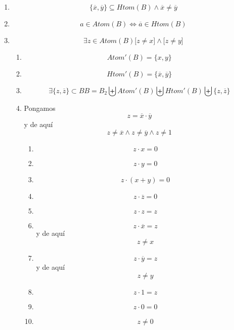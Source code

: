 \begin{enumerate}
\begin{enumerate}
\begin{enumerate}
\begin{enumerate}
\begin{enumerate}
\begin{enumerate}
\begin{enumerate}
              \begin{enumerate}
              \def\labelenumviii{\arabic{enumviii}.}
              \tightlist
              \item
                \[{{{({z \cdot a})} + \overline{a}} = {0 + \overline{a}}} = \overline{a}\]
              \item
                \[{z + \overline{a}} = \overline{a}\]
              \end{enumerate}
            \end{enumerate}
          \end{enumerate}
        \end{enumerate}
      \item
        \[{{\{{\overline{x},\overline{y}}\}} \subseteq \mathit{Htom}}{{{(B)} \land \overline{x}} \neq \overline{y}}\]
      \item
        \[{a \in \mathit{Atom}}{(B)}\Leftrightarrow{\overline{a} \in \mathit{Htom}}{(B)}\]
      \item
        \[\exists{z \in \mathit{Atom}}{(B)}{{\lbrack{z \neq x}\rbrack} \land {\lbrack{z \neq y}\rbrack}}\]

        \begin{enumerate}
        \def\labelenumv{\arabic{enumv}.}
        \item
          \[\mathit{Atom}'{{(B)} = {\{{x,y}\}}}\]
        \item
          \[\mathit{Htom}'{{(B)} = {\{{\overline{x},\overline{y}}\}}}\]
        \item
          \[\exists{{\{{z,\overline{z}}\}} \subset B}{B = B_{2}}\biguplus{\mathit{Atom}'{(B)}}\biguplus{\mathit{Htom}'{(B)}}\biguplus{\{{z,\overline{z}}\}}\]
        \item
          Pongamos \[z = {\overline{x} \cdot \overline{y}}\] y de
          aquí\[{{z \neq {\overline{x} \land z}} \neq {\overline{y} \land z}} \neq 1\]

          \begin{enumerate}
          \def\labelenumvi{\arabic{enumvi}.}
          \item
            \[{z \cdot x} = 0\]
          \item
            \[{z \cdot y} = 0\]
          \item
            \[{z \cdot {({x + y})}} = 0\]
          \item
            \[{z \cdot \overline{z}} = 0\]
          \item
            \[{z \cdot z} = z\]
          \item
            \[{z \cdot \overline{x}} = z\] y de aquí \[z \neq x\]
          \item
            \[{z \cdot \overline{y}} = z\]y de aquí \[z \neq y\]
          \item
            \[{z \cdot 1} = z\]
          \item
            \[{z \cdot 0} = 0\]
          \item
            \[z \neq 0\]


\end{enumerate}
\end{enumerate}
\end{enumerate}
\end{enumerate}
\end{enumerate}
\end{enumerate}
